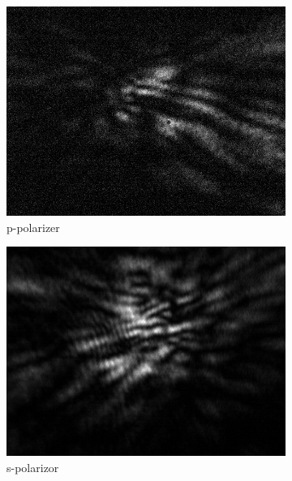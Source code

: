 \begin{figure}[!h]
\centering
  \begin{subfigure}[b]{0.2\textwidth}
    \includegraphics[width=\textwidth]{diffraction_image/2015040117594700071-1}
    \caption{p-polarizer}
  \end{subfigure}
  \begin{subfigure}[b]{0.2\textwidth}
    \includegraphics[width=\textwidth]{diffraction_image/2015040117594700071-2}
    \caption{s-polarizor}
  \end{subfigure}
  \begin{subfigure}[b]{0.2\textwidth}

\end{subfigure}
\end{figure}
